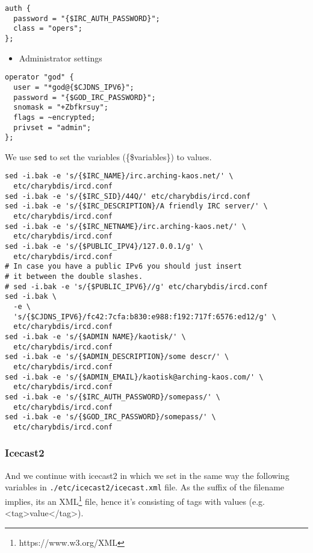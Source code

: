 \documentclass[12pt]{report}
\begin{document}
\begin{verbatim}
auth {
  password = "{$IRC_AUTH_PASSWORD}";
  class = "opers";
};
\end{verbatim}

\begin{itemize}

\item
  Administrator settings
\end{itemize}

\begin{verbatim}
operator "god" {
  user = "*god@{$CJDNS_IPV6}";
  password = "{$GOD_IRC_PASSWORD}";
  snomask = "+Zbfkrsuy";
  flags = ~encrypted;
  privset = "admin";
};
\end{verbatim}

We use \texttt{sed} to set the variables (\{\$variables\}) to values.

\begin{verbatim}
sed -i.bak -e 's/{$IRC_NAME}/irc.arching-kaos.net/' \
  etc/charybdis/ircd.conf
sed -i.bak -e 's/{$IRC_SID}/44Q/' etc/charybdis/ircd.conf
sed -i.bak -e 's/{$IRC_DESCRIPTION}/A friendly IRC server/' \
  etc/charybdis/ircd.conf
sed -i.bak -e 's/{$IRC_NETNAME}/irc.arching-kaos.net/' \
  etc/charybdis/ircd.conf
sed -i.bak -e 's/{$PUBLIC_IPV4}/127.0.0.1/g' \
  etc/charybdis/ircd.conf
# In case you have a public IPv6 you should just insert 
# it between the double slashes.
# sed -i.bak -e 's/{$PUBLIC_IPV6}//g' etc/charybdis/ircd.conf
sed -i.bak \
  -e \
  's/{$CJDNS_IPV6}/fc42:7cfa:b830:e988:f192:717f:6576:ed12/g' \
  etc/charybdis/ircd.conf
sed -i.bak -e 's/{$ADMIN NAME}/kaotisk/' \
  etc/charybdis/ircd.conf
sed -i.bak -e 's/{$ADMIN_DESCRIPTION}/some descr/' \
  etc/charybdis/ircd.conf
sed -i.bak -e 's/{$ADMIN_EMAIL}/kaotisk@arching-kaos.com/' \
  etc/charybdis/ircd.conf
sed -i.bak -e 's/{$IRC_AUTH_PASSWORD}/somepass/' \
  etc/charybdis/ircd.conf
sed -i.bak -e 's/{$GOD_IRC_PASSWORD}/somepass/' \
  etc/charybdis/ircd.conf
\end{verbatim}


\subsubsection{Icecast2}\label{icecast2}

And we continue with icecast2 in which we set in the same way the
following variables in \texttt{./etc/icecast2/icecast.xml} file. As the
suffix of the filename implies, its an XML\footnote{https://www.w3.org/XML} file, hence it's
consisting of tags with values (e.g. <tag>value</tag>).
\end{document}
